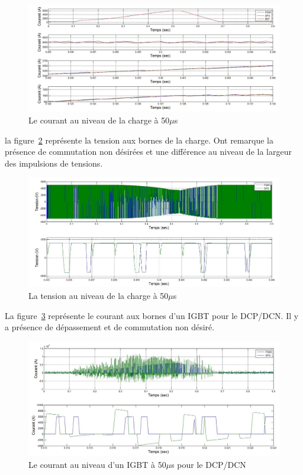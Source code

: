 \documentclass[11pt,letterpaper,final]{report}
\begin{document}
\begin{figure}[htb]
\centering
\includegraphics[scale=0.5]{Fig/DCP_AFE/50u/cour_ch.jpg}
\caption{Le courant au niveau de la charge à 50$\mu$s}
\label{AF_DC_CHA50}
\end{figure}

la figure~\ref{AF_DC_CHV50} représente la tension aux bornes de la charge. Ont remarque la présence de commutation non désirées et une différence au niveau de la largeur des impulsions de tensions.

\begin{figure}[htb]
\centering
\includegraphics[scale=0.5]{Fig/DCP_AFE/50u/ten_ch.jpg}
\caption{La tension au niveau de la charge à 50$\mu$s}
\label{AF_DC_CHV50}
\end{figure}

La figure~\ref{AF_DC_HAA50} représente le courant aux bornes d'un IGBT pour le DCP/DCN. Il y a présence de dépassement et de commutation non désiré.

\begin{figure}[htb]
\centering
\includegraphics[scale=0.5]{Fig/DCP_AFE/50u/hash_cou_IGBT.jpg}
\caption{Le courant au niveau d'un IGBT à 50$\mu$s pour le DCP/DCN}
\label{AF_DC_HAA50}
\end{figure}
\end{document}
